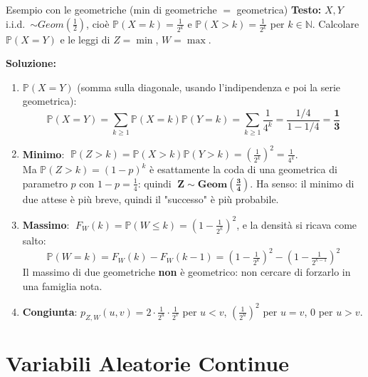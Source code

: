 \documentclass[12pt]{extarticle} %
\begin{document}
\begin{eserciziobox}{{Esempio con le geometriche (min di geometriche $=$ geometrica)}}
\textbf{Testo:} $X, Y$ i.i.d.\ $\sim Geom(\frac12)$, cioè $\mathbb{P}(X = k) = \frac{1}{2^k}$ e $\mathbb{P}(X > k) = \frac{1}{2^k}$ per $k \in \mathbb{N}$. Calcolare $\mathbb{P}(X = Y)$ e le leggi di $Z = \min$, $W = \max$.
\par\textbf{Soluzione:}
\begin{enumerate}
    \item \textbf{$\mathbb{P}(X=Y)$} (somma sulla diagonale, usando l'indipendenza e poi la serie geometrica):
    $$ \mathbb{P}(X = Y) = \sum_{k \ge 1} \mathbb{P}(X=k)\mathbb{P}(Y=k) = \sum_{k\ge1} \frac{1}{4^k} = \frac{1/4}{1 - 1/4} = \mathbf{\frac13} $$
    \item \textbf{Minimo}: $\;\mathbb{P}(Z > k) = \mathbb{P}(X>k)\mathbb{P}(Y>k) = \left(\frac{1}{2^k}\right)^2 = \frac{1}{4^k}$. \\
    Ma $\mathbb{P}(Z>k) = (1-p)^k$ è esattamente la coda di una geometrica di parametro $p$ con $1-p = \frac14$: quindi $\;\mathbf{Z \sim Geom(\frac34)}$. {\footnotesize Ha senso: il minimo di due attese è più breve, quindi il "successo" è più probabile.}
    \item \textbf{Massimo}: $\;F_W(k) = \mathbb{P}(W \le k) = \left(1 - \frac{1}{2^k}\right)^2$, e la densità si ricava come salto:
    $$ \mathbb{P}(W = k) = F_W(k) - F_W(k-1) = \left(1-\tfrac{1}{2^k}\right)^2 - \left(1-\tfrac{1}{2^{k-1}}\right)^2 $$
    {\footnotesize Il massimo di due geometriche \textbf{non} è geometrico: non cercare di forzarlo in una famiglia nota.}
    \item \textbf{Congiunta}: $p_{Z,W}(u,v) = 2\cdot\frac{1}{2^u}\cdot\frac{1}{2^v}$ per $u<v$, \; $\left(\frac{1}{2^u}\right)^2$ per $u=v$, \; $0$ per $u>v$.
\end{enumerate}
\end{eserciziobox}

\newpage


\section{Variabili Aleatorie Continue}
\end{document}
